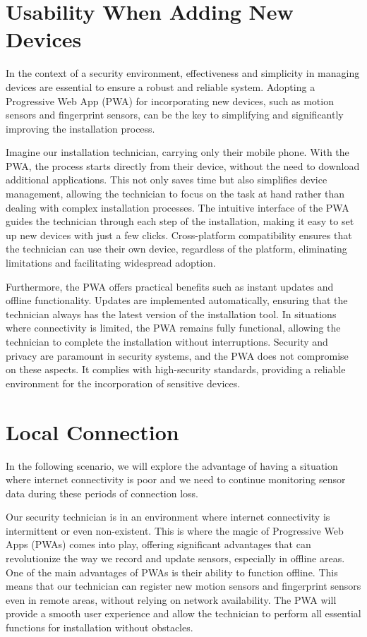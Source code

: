 \documentclass[journal]{IEEEtran}
\begin{document}
	\section*{Usability When Adding New Devices}
	\fontsize{9}{10}\selectfont %
	In the context of a security environment, effectiveness and simplicity in managing devices are essential to ensure a robust and reliable system. Adopting a Progressive Web App (PWA) for incorporating new devices, such as motion sensors and fingerprint sensors, can be the key to simplifying and significantly improving the installation process.
	
	Imagine our installation technician, carrying only their mobile phone. With the PWA, the process starts directly from their device, without the need to download additional applications. This not only saves time but also simplifies device management, allowing the technician to focus on the task at hand rather than dealing with complex installation processes. The intuitive interface of the PWA guides the technician through each step of the installation, making it easy to set up new devices with just a few clicks. Cross-platform compatibility ensures that the technician can use their own device, regardless of the platform, eliminating limitations and facilitating widespread adoption.
	
	Furthermore, the PWA offers practical benefits such as instant updates and offline functionality. Updates are implemented automatically, ensuring that the technician always has the latest version of the installation tool. In situations where connectivity is limited, the PWA remains fully functional, allowing the technician to complete the installation without interruptions. Security and privacy are paramount in security systems, and the PWA does not compromise on these aspects. It complies with high-security standards, providing a reliable environment for the incorporation of sensitive devices.
	
	\section*{Local Connection}
	\fontsize{9}{10}\selectfont %
	In the following scenario, we will explore the advantage of having a situation where internet connectivity is poor and we need to continue monitoring sensor data during these periods of connection loss.
	
	Our security technician is in an environment where internet connectivity is intermittent or even non-existent. This is where the magic of Progressive Web Apps (PWAs) comes into play, offering significant advantages that can revolutionize the way we record and update sensors, especially in offline areas. One of the main advantages of PWAs is their ability to function offline. This means that our technician can register new motion sensors and fingerprint sensors even in remote areas, without relying on network availability. The PWA will provide a smooth user experience and allow the technician to perform all essential functions for installation without obstacles.
	
\end{document}
